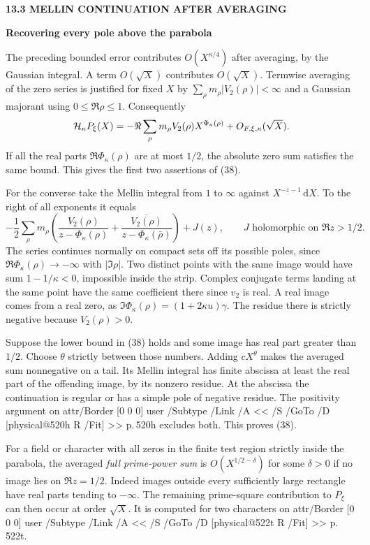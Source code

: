 \documentclass[11pt,letterpaper]{article}
\makeatletter
\newcommand{\rightmarktext}{}
\newcommand{\printfolio}{}
\newcommand{\leaf}[4]{\clearpage\gdef\printfolio{#1}\gdef\rightmarktext{#2}%
  {\small\sffamily\bfseries\color{ink}#3\par}\vspace{3pt}%
  {\LARGE\bfseries #4\par}\vspace{5pt}}
\newcommand{\dd}{\,\mathrm d}
\newcommand{\MusicPDFPageRef}[1]{\pdfpageref\csname physical@#1\endcsname\space\space 0 R}
\newcommand{\pagelink}[2]{\leavevmode\pdfstartlink attr{/Border [0 0 0]} user{%
  /Subtype /Link /A << /S /GoTo /D [\MusicPDFPageRef{#1} /Fit] >>}%
  {\color{ink}#2}\pdfendlink}
\newcommand{\pg}[1]{\pagelink{#1}{p.\,#1}}
\makeatother
\begin{document}
\leaf{522q}{Logarithmic averages}{13.3 \quad MELLIN CONTINUATION AFTER AVERAGING}{Recovering every pole above the parabola}
The preceding bounded error contributes $O(X^{\kappa/4})$ after
averaging, by the Gaussian integral. A term $O(\sqrt X)$ contributes
$O(\sqrt X)$. Termwise averaging of the zero series is justified for
fixed $X$ by $\sum_\rho m_\rho|V_2(\rho)|<\infty$ and a Gaussian
majorant using $0\le\Re\rho\le1$. Consequently
\[
 {\cal H}_\kappa P_\xi(X)=
 -\Re\sum_\rho m_\rho V_2(\rho)X^{\Phi_\kappa(\rho)}
                         +O_{F,\xi,\kappa}(\sqrt X).
\]
If all the real parts $\Re\Phi_\kappa(\rho)$ are at most $1/2$, the
absolute zero sum satisfies the same bound. This gives the first two
assertions of (38).

For the converse take the Mellin integral from $1$ to $\infty$
against $X^{-z-1}\dd X$. To the right of all exponents it equals
\[
 -\frac12\sum_\rho m_\rho\!
   \left(\frac{V_2(\rho)}{z-\Phi_\kappa(\rho)}
   +\frac{\overline{V_2(\rho)}}{z-\Phi_\kappa(\bar\rho)}\right)+J(z),
       \qquad J\text{ holomorphic on }\Re z>1/2.
\]
The series continues normally on compact sets off its possible
poles, since $\Re\Phi_\kappa(\rho)\to-\infty$ with $|\Im\rho|$.
Two distinct points with the same image
would have sum $1-1/\kappa<0$, impossible inside the strip. Complex
conjugate terms landing at the same point have the same coefficient
there since $v_2$ is real. A real image comes from a real zero, as
$\Im\Phi_\kappa(\rho)=(1+2\kappa u)\gamma$.
The residue there is strictly negative because $V_2(\rho)>0$.

Suppose the lower bound in (38) holds and some image has real part
greater than $1/2$. Choose $\theta$ strictly between those numbers.
Adding $cX^\theta$ makes the averaged sum nonnegative on a tail.
Its Mellin integral has finite abscissa at least the real part of
the offending image, by its nonzero residue. At the abscissa the
continuation is regular or has a simple pole of negative residue.
The positivity argument on \pg{520h} excludes both. This proves (38).

For a field or character with all zeros in the finite test region
strictly inside the parabola, the averaged \emph{full prime-power sum}
is $O(X^{1/2-\delta})$ for some $\delta>0$ if no image lies on
$\Re z=1/2$. Indeed images outside every sufficiently large
rectangle have real parts tending to $-\infty$. The remaining
prime-square contribution to $P_\xi$ can then occur at order
$\sqrt X$. It is computed for two characters on \pg{522t}.
\end{document}
